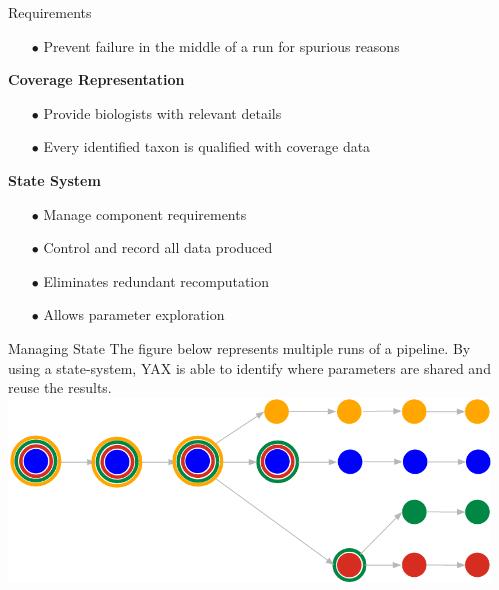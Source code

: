 \documentclass[final,t]{beamer}
\begin{document}
\begin{frame}{}
\begin{columns}[t]
\begin{column}{.3\linewidth}
\begin{block}{Requirements}
\begin{itemize}
                \item[$\bullet$]Prevent failure in the middle of a run for spurious reasons
            \end{itemize}
            \vspace{0.5cm}
            \textbf{Coverage Representation}
            \begin{itemize}
                \item[$\bullet$]Provide biologists with relevant details
                \item[$\bullet$]Every identified taxon is qualified with coverage data
            \end{itemize}
            \vspace{0.5cm}
            \textbf{State System}
            \begin{itemize}
                \item[$\bullet$]Manage component requirements
                \item[$\bullet$]Control and record all data produced
                \item[$\bullet$]Eliminates redundant recomputation
                \item[$\bullet$]Allows parameter exploration
            \end{itemize}
        \end{block}

        \begin{block}{Managing State}
            The figure below represents multiple runs of a pipeline. By using a state-system, YAX is able to identify where parameters are shared and reuse the results. \\
            \includegraphics[width=1\linewidth]{assets/Artifacts}
        \end{block}



    \end{column}
    \begin{column}{.3\linewidth}



\end{column}
\end{columns}
\end{frame}
\end{document}
